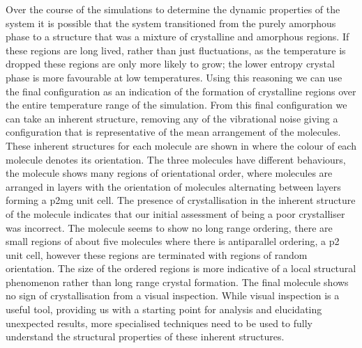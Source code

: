 Over the course of the simulations to determine the dynamic properties of the system it is possible that the system transitioned from the purely amorphous phase to a structure that was a mixture of crystalline and amorphous regions. If these regions are long lived, rather than just fluctuations, as the temperature is dropped these regions are only more likely to grow; the lower entropy crystal phase is more favourable at low temperatures. Using this reasoning we can use the final configuration as an indication of the formation of crystalline regions over the entire temperature range of the simulation. From this final configuration we can take an inherent structure, removing any of the vibrational noise giving a configuration that is representative of the mean arrangement of the molecules. These inherent structures for each molecule are shown in  where the colour of each molecule denotes its orientation. The three molecules have different behaviours, the \sone molecule  shows many regions of orientational order, where molecules are arranged in layers with the orientation of molecules alternating between layers forming a p2mg unit cell. The presence of crystallisation in the inherent structure of the \sone molecule indicates that our initial assessment of being a poor crystalliser was incorrect. The \scon molecule  seems to show no long range ordering, there are small regions of about five molecules where there is antiparallel ordering, a p2 unit cell, however these regions are terminated with regions of random orientation. The size of the ordered regions is more indicative of a local structural phenomenon rather than long range crystal formation. The final molecule \tri {} shows no sign of crystallisation from a visual inspection. While visual inspection is a useful tool, providing us with a starting point for analysis and elucidating unexpected results, more specialised techniques need to be used to fully understand the structural properties of these inherent structures.

